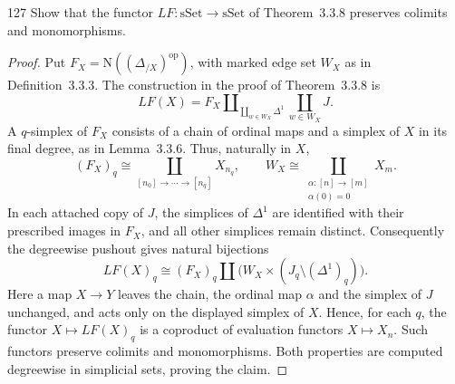 \begin{exercise}{127}
Show that the functor $LF\colon\mathrm{sSet}\to\mathrm{sSet}$ of Theorem~3.3.8 preserves colimits
and monomorphisms.

\begin{proof}
Put $F_X=\mathrm N((\Delta_{/X})^{\mathrm{op}})$, with marked edge set $W_X$
as in Definition~3.3.3.
The construction in the proof of Theorem~3.3.8 is
\[
 LF(X)=F_X\amalg_{\coprod_{w\in W_X}\Delta^1}
                   \coprod_{w\in W_X}J.
\]
A $q$-simplex of $F_X$ consists of a chain of ordinal maps and a simplex
of $X$ in its final degree, as in Lemma~3.3.6. Thus, naturally in $X$,
\[
 (F_X)_q\cong
 \coprod_{[n_0]\to\cdots\to[n_q]}X_{n_q},
 \qquad
 W_X\cong\coprod_{\substack{\alpha\colon[n]\to[m]\\\alpha(0)=0}}X_m.
\]
In each attached copy of $J$, the simplices of $\Delta^1$ are identified
with their prescribed images in $F_X$, and all other simplices remain
distinct. Consequently the degreewise pushout gives natural bijections
\[
 LF(X)_q\cong (F_X)_q\amalg
       \bigl(W_X\times(J_q\setminus(\Delta^1)_q)\bigr).
\]
Here a map $X\to Y$ leaves the chain, the ordinal map $\alpha$ and the
simplex of $J$ unchanged, and acts only on the displayed simplex of $X$.
Hence, for each $q$, the functor $X\mapsto LF(X)_q$ is a coproduct of
evaluation functors $X\mapsto X_n$.
Such functors preserve colimits and monomorphisms.
Both properties are computed degreewise in simplicial sets, proving the claim.
\end{proof}
\end{exercise}
